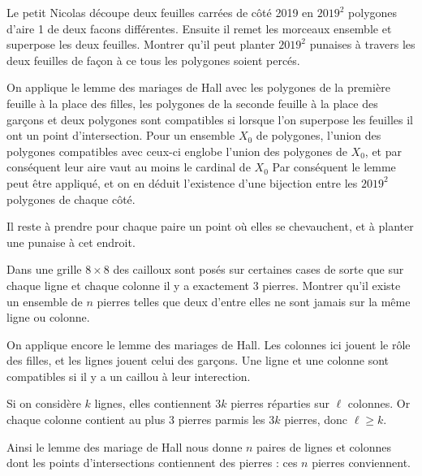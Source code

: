 \begin{exo}
Le petit Nicolas découpe deux feuilles carrées de côté 2019 en $2019^2$ polygones d'aire 1 de deux facons différentes. Ensuite il remet les morceaux ensemble et superpose les deux feuilles. Montrer qu'il peut planter $2019^2$ punaises à travers les deux feuilles de façon à ce tous les polygones soient percés.
\end{exo}

\begin{sol}

On applique le lemme des mariages de Hall avec les polygones de la première feuille à la place des filles, les polygones de la seconde feuille à la place des garçons et deux polygones sont compatibles si lorsque l'on superpose les feuilles il ont un point d'intersection. Pour un ensemble $X_0$ de polygones, l'union des polygones compatibles avec ceux-ci englobe l'union des polygones de $X_0$, et par conséquent leur aire vaut au moins le cardinal de $X_0$ Par conséquent le lemme peut être appliqué, et on en déduit l'existence d'une bijection entre les $2019^2$ polygones de chaque côté.

\smallskip
 Il reste à prendre pour chaque paire un point où elles se chevauchent, et à planter une punaise à cet endroit.

\end{sol}

\begin{exo}
Dans une grille $8\times 8$ des cailloux sont posés sur certaines cases de sorte que sur chaque ligne et chaque colonne il y a exactement $3$ pierres. Montrer qu'il existe un ensemble de $n$ pierres telles que deux d'entre elles ne sont jamais sur la même ligne ou colonne.
\end{exo}

\begin{sol}
On applique encore le lemme des mariages de Hall. Les colonnes ici jouent le rôle des filles, et les lignes jouent celui des garçons. Une ligne et une colonne sont compatibles si il y a un caillou à leur interection.

Si on considère $k$ lignes, elles contiennent $3k$ pierres réparties sur $\ell$ colonnes. Or chaque colonne contient au plus $3$ pierres parmis les $3k$ pierres, donc $\ell \geq k$.

\smallskip

Ainsi le lemme des mariage de Hall nous donne $n$ paires de lignes et colonnes dont les points d'intersections contiennent des pierres : ces $n$ pierres conviennent.
\end{sol}

